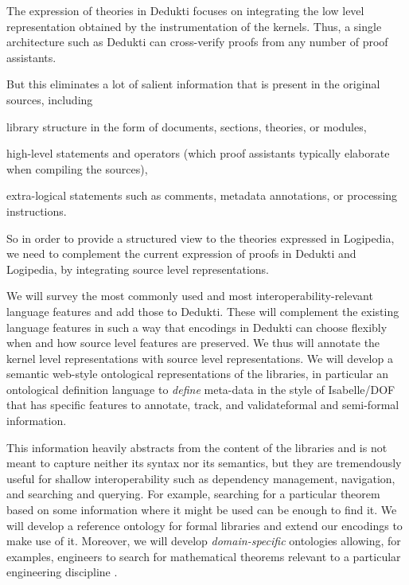 The expression of theories in Dedukti focuses on integrating the low
level representation obtained by the instrumentation of the kernels.  Thus, a
single architecture such as Dedukti can cross-verify proofs from any
number of proof assistants.

But this eliminates a lot of salient information that is present in
the original sources, including
\begin{compactitem}
\item library structure in the form of documents, sections,
  theories, or modules,
\item high-level statements and operators (which proof assistants
  typically elaborate when compiling the sources),
\item extra-logical statements such as comments, metadata annotations,
  or processing instructions.
\end{compactitem}

So in order to provide a structured view to the theories expressed in Logipedia,
we need to complement the current expression of proofs in Dedukti
and Logipedia, by integrating source level representations.

We will survey the most commonly used and most
interoperability-relevant language features and add those to Dedukti.
These will complement the existing language features in such a way
that encodings in Dedukti can choose flexibly when and how source
level features are preserved.  We thus will annotate the kernel level
representations with source level representations.  We will develop a
semantic web-style ontological representations of the libraries, 
in particular an ontological definition language to \emph{define}
meta-data in the style of Isabelle/DOF
\cite {brucker_achim_d_2019_3370483,brucker.ea:isabelle-ontologies:2018,brucker.ea:ontologies-certification:2019}
that has specific features to annotate, track, and 
validateformal and semi-formal information.

This information heavily abstracts from the content of the libraries and
is not meant to capture neither its syntax nor its semantics, but they
are tremendously useful for shallow interoperability such as
dependency management, navigation, and searching and querying.  For
example, searching for a particular theorem based on some information
where it might be used can be enough to find it.  We will develop a
reference ontology for formal libraries and extend our encodings to
make use of it. Moreover, we will develop \emph{domain-specific} ontologies
allowing, for examples, engineers to search for mathematical theorems
relevant to a particular engineering discipline
\cite{brucker.ea:ontologies-certification:2019}.

